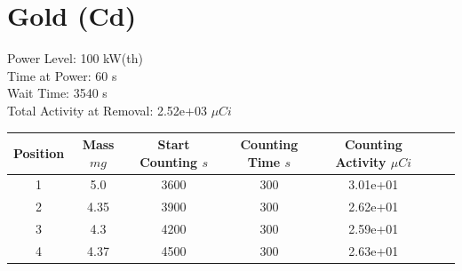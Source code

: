 \newpage

\section*{ Gold  (Cd) }

Power Level: 100 kW(th) \\
Time at Power: 60 s \\
Wait Time: 3540 s \\
Total Activity at Removal: 2.52e+03 $\mu Ci$

\begin{table}[h]
\centering
\begin{tabular}{ |c|c|c|c|c|c|c| }
 \hline
 Position & Mass $mg$ & Start Counting $s$ & Counting Time $s$ & Counting Activity $\mu Ci$ \\
 \hline 
 1 & 5.0 & 3600 & 300 & 3.01e+01\\ 
\hline
 2 & 4.35 & 3900 & 300 & 2.62e+01\\ 
\hline
 3 & 4.3 & 4200 & 300 & 2.59e+01\\ 
\hline
 4 & 4.37 & 4500 & 300 & 2.63e+01\\ 
\hline
\end{tabular}
\end{table}

